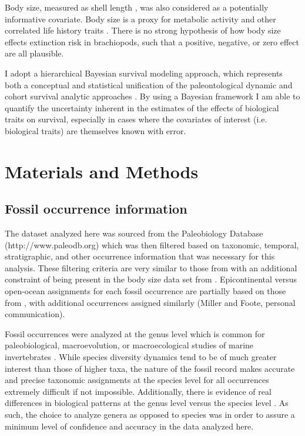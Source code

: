 \documentclass{article}
\begin{document}
Body size, measured as shell length \citep{Payne2014}, was also considered as a potentially informative covariate. Body size is a proxy for metabolic activity and other correlated life history traits \citep{Payne2014}. There is no strong hypothesis of how body size effects extinction risk in brachiopods, such that a positive, negative, or zero effect are all plausible. 

I adopt a hierarchical Bayesian survival modeling approach, which represents both a conceptual and statistical unification of the paleontological dynamic and cohort survival analytic approaches \citep{VanValen1973,VanValen1979,Raup1978,Raup1975,Foote1988,Baumiller1993,Simpson2006}. By using a Bayesian framework I am able to quantify the uncertainty inherent in the estimates of the effects of biological traits on survival, especially in cases where the covariates of interest (i.e. biological traits) are themselves known with error. 


\section{Materials and Methods}

\subsection{Fossil occurrence information}

The dataset analyzed here was sourced from the Paleobiology Database (http://www.paleodb.org) which was then filtered based on taxonomic, temporal, stratigraphic, and other occurrence information that was necessary for this analysis. These filtering criteria are very similar to those from \citet{Foote2013} with an additional constraint of being present in the body size data set from \citet{Payne2014}. Epicontinental versus open-ocean assignments for each fossil occurrence are partially based on those from \citet{Miller2009a}, with additional occurrences assigned similarly (Miller and Foote, personal communication).

Fossil occurrences were analyzed at the genus level which is common for paleobiological, macroevolution, or macroecological studies of marine invertebrates \citep{Alroy2010,Foote2013,Harnik2013,Kiessling2007a,Miller2009a,Nurnberg2013a,Nurnberg2015,Payne2007,Simpson2009,Vilhena2013}. While species diversity dynamics tend to be of much greater interest than those of higher taxa, the nature of the fossil record makes accurate and precise taxonomic assignments at the species level for all occurrences extremely difficult if not impossible. Additionally, there is evidence of real differences in biological patterns at the genus level versus the species level \citep{Jablonski1987}. As such, the choice to analyze genera as opposed to species was in order to assure a minimum level of confidence and accuracy in the data analyzed here.
\end{document}

